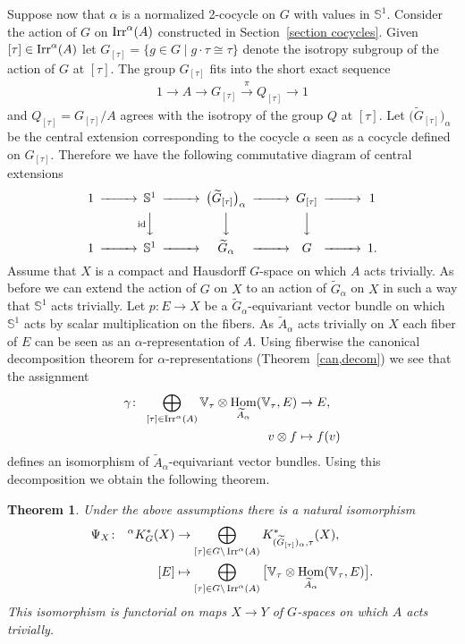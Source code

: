 \documentclass[11pt]{article}
\numberwithin{equation}{section}
\def\S{\mathbb{S}}
\def\V{\mathbb{V}}
\DeclareMathOperator{\Hom}{\textup{Hom}}
\DeclareMathOperator{\Irr}{\textup{Irr}}
\newtheorem{Th}{Theorem}[section]
\theoremstyle{definition}
\numberwithin{equation}{section}
\begin{document}
Suppose now that $\alpha$ is a normalized 2-cocycle on $G$ with values in $\S^{1}$.
Consider the action of $G$ on $\Irr^{\alpha}(A)$ constructed in Section~\ref{section cocycles}.
Given $[\tau]\in \Irr^{\alpha}(A)$ let $G_{[\tau]}=\{g\in G \mid g\cdot \tau\cong \tau\}$ denote
the isotropy subgroup of the action of $G$ at $[\tau]$. The group $G_{[\tau]}$ fits into
the short exact sequence
\begin{gather*}
1\rightarrow A\rightarrow G_{[\tau]}\stackrel{\pi}{\rightarrow} Q_{[\tau]}\rightarrow 1
\end{gather*}
and $Q_{[\tau]}=G_{[\tau]}/A$ agrees with the isotropy of the group $Q$ at $[\tau]$. Let
$\big(\widetilde{G}_{[\tau]}\big)_{\alpha}$ be the central extension corresponding to the cocycle
$\alpha$ seen as a cocycle defined on $G_{[\tau]}$. Therefore we have the following commutative
diagram of central extensions
\begin{equation*}
\begin{CD}
1 @>>> \S^{1}@>>>\big(\widetilde{G}_{[\tau]}\big)_{\alpha} @>>> G_{[\tau]} @>>> 1\\
@. @V{\text{id}}VV @VVV @VVV @. \\
1 @>>> \S^{1}@>>>\widetilde{G}_{\alpha} @>>> G @>>> 1.
\end{CD}
\end{equation*}
Assume that $X$ is a compact and Hausdorff $G$-space on which $A$ acts trivially.
As before we can extend the action of $G$ on $X$ to an action of $\widetilde{G}_{\alpha}$
on $X$ in such a way that $\S^{1}$ acts trivially. Let $p\colon E\to X$ be a
$\widetilde{G}_{\alpha}$-equivariant vector bundle on which $\S^{1}$ acts by scalar
multiplication on the fibers. As $\widetilde{A}_{\alpha}$ acts trivially on
$X$ each fiber of $E$ can be seen as an $\alpha$-representation of $A$. Using
fiberwise the canonical decomposition theorem for $\alpha$-representations
(Theorem~\ref{can,decom}) we see that the assignment
\begin{align*}
\gamma\colon\ \bigoplus_{[\tau]\in \Irr^{\alpha}(A)}\V_{\tau}\otimes
\Hom_{\widetilde{A}_{\alpha}}(\V_{\tau},E)&\rightarrow E,
\\
v\otimes f&\mapsto f(v)
\end{align*}
defines an isomorphism of $\widetilde{A}_{\alpha}$-equivariant vector bundles.
Using this decomposition we obtain the following theorem.

%
%
\begin{Th}\label{ThD}
Under the above assumptions there is a natural isomorphism
\begin{align*}
\Psi_{X}\colon\ \phantom{i}^{\alpha}K_{G}^{\ast}(X)&\rightarrow
\bigoplus_{[\tau]\in G\backslash \Irr^{\alpha}(A)}
K^{\ast}_{(\widetilde{G}_{[\tau]})_{\alpha},\tau}(X),
\\
[E]&\mapsto \bigoplus_{[\tau]\in G\backslash \Irr^{\alpha}(A)}
\big[\V_{\tau}\otimes\Hom_{\widetilde{A}_{\alpha}}(\V_{\tau},E)\big].
\end{align*}
This isomorphism is
functorial on maps $X\rightarrow Y$ of $G$-spaces on which $A$ acts trivially.
\end{Th}
\end{document}
